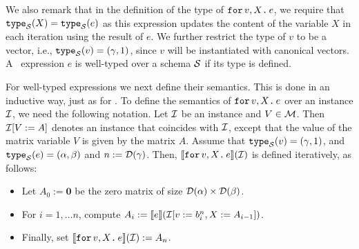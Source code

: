 %
We also remark that in the definition of the type of $\texttt{for}\, v,X \texttt{.}\, e$, we require that $\texttt{type}_{\mathcal{S}}(X) = \texttt{type}_{\mathcal{S}}(e)$ as this expression updates the content of the variable $X$ in each iteration using the result of $e$. We further restrict the type of 
$v$ to be a vector, i.e., $\texttt{type}_{\mathcal{S}}(v)=(\gamma,1)$, since $v$ will be instantiated with canonical vectors.
%
A \langfor\ expression $e$ is well-typed over a schema $\mathcal{S}$ if its type is defined. 

For well-typed expressions we next define their semantics. This is done in an inductive way, just as for \lang. To define the semantics of $\texttt{for}\, v,X \texttt{.}\, e$ over an instance $\mathcal{I}$, we need the following notation. Let $\mathcal{I}$ be an instance and $V\in \mathcal{M}$. Then $\mathcal{I}[V := A]$ denotes an instance that coincides with $\mathcal{I}$, except that the value of the matrix variable $V$ is given by the matrix $A$. Assume that
$\texttt{type}_{\mathcal{S}}(v)= (\gamma,1)$, and $\texttt{type}_{\mathcal{S}}(e) = (\alpha,\beta)$ and $n := \mathcal{D}(\gamma)$. Then, $\llbracket \texttt{for}\, v,X \texttt{.}\, e \rrbracket(\mathcal{I})$ is defined iteratively, as follows:
\begin{itemize}
\item Let $A_0 := \mathbf{0}$ be the zero matrix of size $\mathcal{D}(\alpha)\times \mathcal{D}(\beta)$.
\item For $i=1,\ldots n$, compute $A_i:= \llbracket e \rrbracket(\mathcal{I}[v := b^{n}_i, X:= A_{i-1}])$.
\item Finally, set $\llbracket \texttt{for}\, v,X \texttt{.}\, e \rrbracket(\mathcal{I}):= A_{n}$.
\end{itemize}

